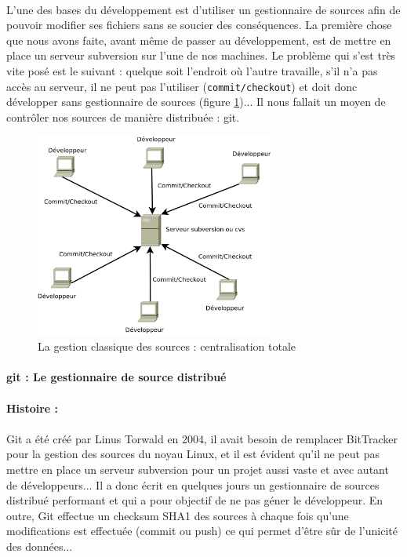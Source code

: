 \paragraph{} L'une des bases du développement est d'utiliser un gestionnaire de sources afin de pouvoir modifier ses fichiers sans se soucier des conséquences. La première chose que nous avons faite, avant même de passer au développement, est de mettre en place un serveur subversion sur l'une de nos machines. Le problème qui s'est très vite posé est le suivant : quelque soit l'endroit où l'autre travaille, s'il n'a pas accès au serveur, il ne peut pas l'utiliser (\verb|commit/checkout|) et doit donc développer sans gestionnaire de sources (figure \ref{svn})... Il nous fallait un moyen de contrôler nos sources de manière distribuée : git.

\begin{figure}[!ht]
\begin{center}
        \includegraphics[width=0.7\textwidth]{./schema/svn.png}
\caption{La gestion classique des sources : centralisation totale }
\label{svn}
\end{center}
\end{figure}


\paragraph{git : Le gestionnaire de source distribué}
\label{gitPar}
\paragraph{Histoire :}
\paragraph{} Git a été créé par Linus Torwald en 2004, il avait besoin de remplacer BitTracker pour la gestion des sources du noyau Linux, et il est évident qu'il ne peut pas mettre en place un serveur subversion pour un projet aussi vaste et avec autant de développeurs... Il a donc écrit en quelques jours un gestionnaire de sources distribué performant et qui a pour objectif de ne pas géner le développeur. En outre, Git effectue un checksum SHA1 des sources à chaque fois qu'une modifications est effectuée (commit ou push) ce qui permet d'être sûr de l'unicité des données...

